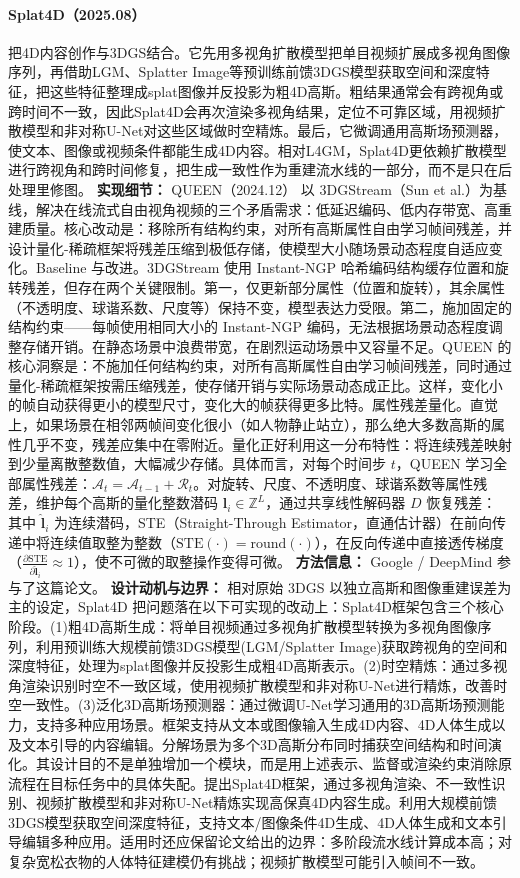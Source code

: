 \paragraph{Splat4D（2025.08）\cite{2508_07557}}
把4D内容创作与3DGS结合。它先用多视角扩散模型把单目视频扩展成多视角图像序列，再借助LGM、Splatter Image等预训练前馈3DGS模型获取空间和深度特征，把这些特征整理成splat图像并反投影为粗4D高斯。粗结果通常会有跨视角或跨时间不一致，因此Splat4D会再次渲染多视角结果，定位不可靠区域，用视频扩散模型和非对称U-Net对这些区域做时空精炼。最后，它微调通用高斯场预测器，使文本、图像或视频条件都能生成4D内容。相对L4GM，Splat4D更依赖扩散模型进行跨视角和跨时间修复，把生成一致性作为重建流水线的一部分，而不是只在后处理里修图。
\textbf{实现细节：} QUEEN（2024.12） 以 3DGStream（Sun et al.）为基线，解决在线流式自由视角视频的三个矛盾需求：低延迟编码、低内存带宽、高重建质量。核心改动是：移除所有结构约束，对所有高斯属性自由学习帧间残差，并设计量化-稀疏框架将残差压缩到极低存储，使模型大小随场景动态程度自适应变化。Baseline 与改进。3DGStream 使用 Instant-NGP 哈希编码结构缓存位置和旋转残差，但存在两个关键限制。第一，仅更新部分属性（位置和旋转），其余属性（不透明度、球谐系数、尺度等）保持不变，模型表达力受限。第二，施加固定的结构约束——每帧使用相同大小的 Instant-NGP 编码，无法根据场景动态程度调整存储开销。在静态场景中浪费带宽，在剧烈运动场景中又容量不足。QUEEN 的核心洞察是：不施加任何结构约束，对所有高斯属性自由学习帧间残差，同时通过量化-稀疏框架按需压缩残差，使存储开销与实际场景动态成正比。这样，变化小的帧自动获得更小的模型尺寸，变化大的帧获得更多比特。属性残差量化。直觉上，如果场景在相邻两帧间变化很小（如人物静止站立），那么绝大多数高斯的属性几乎不变，残差应集中在零附近。量化正好利用这一分布特性：将连续残差映射到少量离散整数值，大幅减少存储。具体而言，对每个时间步 $t$，QUEEN 学习全部属性残差：$\mathcal{A}_t = \mathcal{A}_{t-1} + \mathcal{R}_t$。对旋转、尺度、不透明度、球谐系数等属性残差，维护每个高斯的量化整数潜码 $\mathbf{l}_i \in \mathbb{Z}^L$，通过共享线性解码器 $D$ 恢复残差： 其中 $\hat{\mathbf{l}}_i$ 为连续潜码，STE（Straight-Through Estimator，直通估计器）在前向传递中将连续值取整为整数（$\mathrm{STE}(\cdot) = \mathrm{round}(\cdot)$），在反向传递中直接透传梯度（$\frac{\partial \mathrm{STE}}{\partial \hat{\mathbf{l}}_i} \approx 1$），使不可微的取整操作变得可微。
\textbf{方法信息：} Google / DeepMind 参与了这篇论文。
\textbf{设计动机与边界：} 相对原始 3DGS 以独立高斯和图像重建误差为主的设定，Splat4D 把问题落在以下可实现的改动上：Splat4D框架包含三个核心阶段。(1)粗4D高斯生成：将单目视频通过多视角扩散模型转换为多视角图像序列，利用预训练大规模前馈3DGS模型(LGM/Splatter Image)获取跨视角的空间和深度特征，处理为splat图像并反投影生成粗4D高斯表示。(2)时空精炼：通过多视角渲染识别时空不一致区域，使用视频扩散模型和非对称U-Net进行精炼，改善时空一致性。(3)泛化3D高斯场预测器：通过微调U-Net学习通用的3D高斯场预测能力，支持多种应用场景。框架支持从文本或图像输入生成4D内容、4D人体生成以及文本引导的内容编辑。分解场景为多个3D高斯分布同时捕获空间结构和时间演化。其设计目的不是单独增加一个模块，而是用上述表示、监督或渲染约束消除原流程在目标任务中的具体失配。提出Splat4D框架，通过多视角渲染、不一致性识别、视频扩散模型和非对称U-Net精炼实现高保真4D内容生成。利用大规模前馈3DGS模型获取空间深度特征，支持文本/图像条件4D生成、4D人体生成和文本引导编辑多种应用。适用时还应保留论文给出的边界：多阶段流水线计算成本高；对复杂宽松衣物的人体特征建模仍有挑战；视频扩散模型可能引入帧间不一致。
